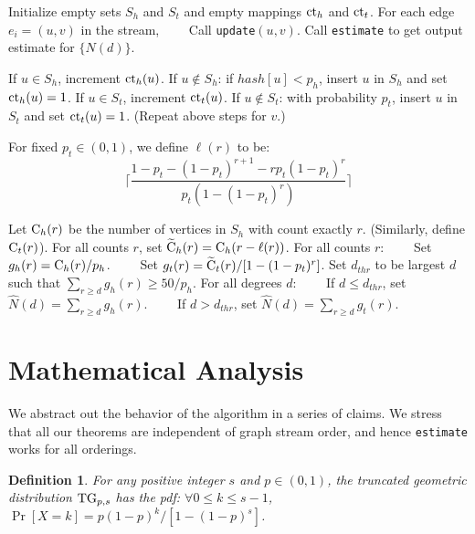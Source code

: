 \documentclass[11pt]{article}
\newtheorem{definition}{Definition}
\theoremstyle{definition}
\newcommand{\C}{\hbox{C}}
\newcommand{\tC}{\widetilde{\hbox{C}}}
\newcommand{\ct}{\hbox{ct}}
\newcommand{\tg}{\hbox{TG}}
\newcommand{\hN}{\widehat{N}}
\newcommand{\degdist}{{\tt headtail}}
\newcommand{\update}{{\tt update}}
\newcommand{\est}{{\tt estimate}}
\begin{document}
\begin{algorithm}
\caption{\degdist$(p_h,p_t)$} \label{alg:degdist}
\DontPrintSemicolon
Initialize empty sets $S_h$ and $S_t$ and empty mappings $\ct_h$ and $\ct_t$.\;
For each edge $e_i = (u,v)$ in the stream,\;
\ \ \ \ Call \update$(u,v)$.\;
Call \est{} to get output estimate for $\{N(d)\}$.\;
\end{algorithm}

\begin{algorithm}
\caption{\update$(u,v)$} \label{alg:update}
\DontPrintSemicolon
If $u \in S_h$, increment $\ct_h(u)$.\;
If $u \notin S_h$: if $hash[u] < p_h$, insert $u$ in $S_h$ and set $\ct_h(u) = 1$.\;
If $u \in S_t$, increment $\ct_t(u)$.\;
If $u \notin S_t$: with probability $p_t$, insert $u$ in $S_t$ and set $\ct_t(u) = 1$.\;
(Repeat above steps for $v$.)
\end{algorithm}

For fixed $p_t \in (0,1)$, we define $\ell(r)$ to be:
$$\Big\lceil\frac{1 - p_t - (1-p_t)^{r+1} - rp_t(1-p_t)^r}{p_t(1-(1-p_t)^r)}\Big\rceil$$


\begin{algorithm}
\caption{\est} \label{alg:est}
\DontPrintSemicolon
Let $\C_h(r)$ be the number of vertices in $S_h$ with count exactly $r$. (Similarly, define $\C_t(r)$).\;
For all counts $r$, set $\tC_h(r) = \C_h(r-\ell(r))$.\;
For all counts $r$:\;
\ \ \ \ Set $g_h(r) = \C_h(r)/p_h$.\;
\ \ \ \ Set $g_t(r) = \tC_t(r)/[1-(1-p_t)^r]$.\;
Set $d_{thr}$ to be largest $d$ such that $\sum_{r \geq d} g_h(r) \geq 50/p_h$.\;
For all degrees $d$:\;
\ \ \ \ If $d \leq d_{thr}$, set $\hN(d) = \sum_{r \geq d} g_h(r)$.\;
\ \ \ \ If $d > d_{thr}$, set $\hN(d) = \sum_{r \geq d} g_t(r)$.\;
\end{algorithm}

\section{Mathematical Analysis} \label{sec:math}

We abstract out the behavior of the algorithm in a series of claims.
We stress that all our theorems are independent of graph stream order, and hence
\est{} works for all orderings.

\begin{definition} \label{def:geo} For any positive integer $s$ and $p \in (0,1)$, the \emph{truncated
geometric distribution} $\tg_{p,s}$ has the pdf: $\forall 0 \leq k \leq s-1$, $\Pr[X = k] = p(1-p)^k/[1-(1-p)^s]$.
\end{definition}
\end{document}
